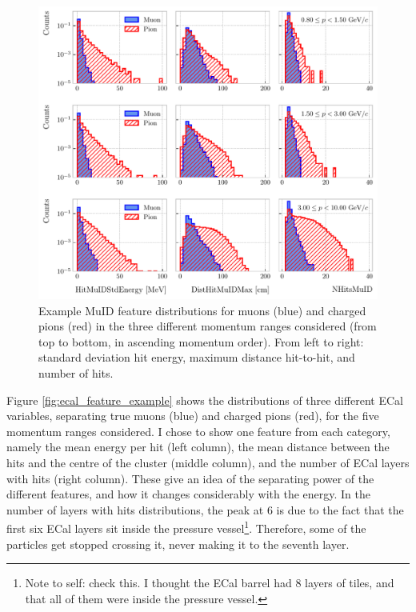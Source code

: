 \begin{figure}[t]
	\centering
	\includegraphics[width=.95\linewidth]{Images/GArSoft_PID/BDT/muid_feature_distribution_all_example.pdf}
	\caption[Example MuID feature distributions for muons and charged pions in the three different momentum ranges considered.]{Example MuID feature distributions for muons (blue) and charged pions (red) in the three different momentum ranges considered (from top to bottom, in ascending momentum order). From left to right: standard deviation hit energy, maximum distance hit-to-hit, and number of hits.}
	\label{fig:muid_feature_example}
\end{figure}

Figure \ref{fig:ecal_feature_example} shows the distributions of three different ECal variables, separating true muons (blue) and charged pions (red), for the five momentum ranges considered. I chose to show one feature from each category, namely the mean energy per hit (left column), the mean distance between the hits and the centre of the cluster (middle column), and the number of ECal layers with hits (right column). These give an idea of the separating power of the different features, and how it changes considerably with the energy. In the number of layers with hits distributions, the peak at $6$ is due to the fact that the first six ECal layers sit inside the pressure vessel\footnote{Note to self: check this. I thought the ECal barrel had 8 layers of tiles, and that all of them were inside the pressure vessel.}. Therefore, some of the particles get stopped crossing it, never making it to the seventh layer.


